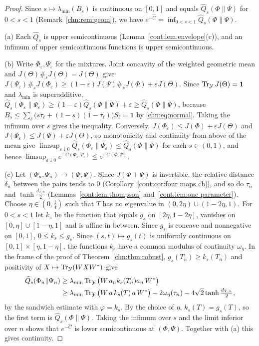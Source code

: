 \begin{proof}
Since $s\mapsto\lambda_{\min}(B_s)$ is continuous on $[0,1]$ and equals $\widehat Q_s(\Phi\|\Psi)$ for $0<s<1$ (Remark~\ref{chn:rem:geom}), we have $e^{-\widehat C}=\inf_{0<s<1}\widehat Q_s(\Phi\|\Psi)$.

(a) Each $\widehat Q_s$ is upper semicontinuous (Lemma~\ref{cont:lem:envelope}(c)), and an infimum of upper semicontinuous functions is upper semicontinuous.

(b) Write $\Phi_\varepsilon,\Psi_\varepsilon$ for the mixtures. Joint concavity of the weighted geometric mean \cite{KuboAndo1980} and $J(\Theta)\#_sJ(\Theta)=J(\Theta)$ give $J(\Psi_\varepsilon)\#_sJ(\Phi_\varepsilon)\ge(1-\varepsilon)J(\Psi)\#_sJ(\Phi)+\varepsilon J(\Theta)$. Since $\operatorname{Tr}_{\mathcal Y}J(\Theta)=\mathbf 1$ and $\lambda_{\min}$ is superadditive, $\widehat Q_s(\Phi_\varepsilon\|\Psi_\varepsilon)\ge(1-\varepsilon)\widehat Q_s(\Phi\|\Psi)+\varepsilon\ge\widehat Q_s(\Phi\|\Psi)$, because $B_s\le\sum_\ell\big(s\tau_\ell+(1-s)(1-\tau_\ell)\big)S_\ell=\mathbf 1$ by \eqref{chn:eq:normal}. Taking the infimum over $s$ gives the inequality. Conversely, $J(\Phi_\varepsilon)\le J(\Phi)+\varepsilon J(\Theta)$ and $J(\Psi_\varepsilon)\le J(\Psi)+\varepsilon J(\Theta)$, so monotonicity and continuity from above of the mean give $\limsup_{\varepsilon\downarrow0}\widehat Q_s(\Phi_\varepsilon\|\Psi_\varepsilon)\le\widehat Q_s(\Phi\|\Psi)$ for each $s\in(0,1)$, and hence $\limsup_{\varepsilon\downarrow0}e^{-\widehat C(\Phi_\varepsilon,\Psi_\varepsilon)}\le e^{-\widehat C(\Phi,\Psi)}$.

(c) Let $(\Phi_n,\Psi_n)\to(\Phi,\Psi)$. Since $J(\Phi+\Psi)$ is invertible, the relative distance $\delta_n$ between the pairs tends to $0$ (Corollary~\ref{cont:cor:four maps cb}), and so do $\tau_n$ and $\tanh\frac{d_{T,n}}2$ (Lemmas~\ref{cont:lem:thompson} and~\ref{cont:lem:one parameter}). Choose $\eta\in(0,\frac14)$ such that $T$ has no eigenvalue in $(0,2\eta)\cup(1-2\eta,1)$. For $0<s<1$ let $k_s$ be the function that equals $g_s$ on $[2\eta,1-2\eta]$, vanishes on $[0,\eta]\cup[1-\eta,1]$ and is affine in between. Since $g_s$ is concave and nonnegative on $[0,1]$, $0\le k_s\le g_s$. Since $(s,t)\mapsto g_s(t)$ is uniformly continuous on $[0,1]\times[\eta,1-\eta]$, the functions $k_s$ have a common modulus of continuity $\omega_\eta$. In the frame of the proof of Theorem~\ref{chn:thm:robust}, $g_s(T_n)\ge k_s(T_n)$ and positivity of $X\mapsto\operatorname{Tr}_{\mathcal Y}(WXW^*)$ give
\[
\begin{aligned}
\widehat Q_s(\Phi_n\|\Psi_n)&\ge\lambda_{\min}\operatorname{Tr}_{\mathcal Y}\big(W\,a_nk_s(T_n)a_n\,W^*\big)\\
&\ge\lambda_{\min}\operatorname{Tr}_{\mathcal Y}\big(W\,a\,k_s(T)\,a\,W^*\big)-2\omega_\eta(\tau_n)-4\sqrt2\tanh\tfrac{d_{T,n}}2,
\end{aligned}
\]
by the sandwich estimate with $\varphi=k_s$. By the choice of $\eta$, $k_s(T)=g_s(T)$, so the first term is $\widehat Q_s(\Phi\|\Psi)$. Taking the infimum over $s$ and the limit inferior over $n$ shows that $e^{-\widehat C}$ is lower semicontinuous at $(\Phi,\Psi)$. Together with (a) this gives continuity.


\end{proof}
